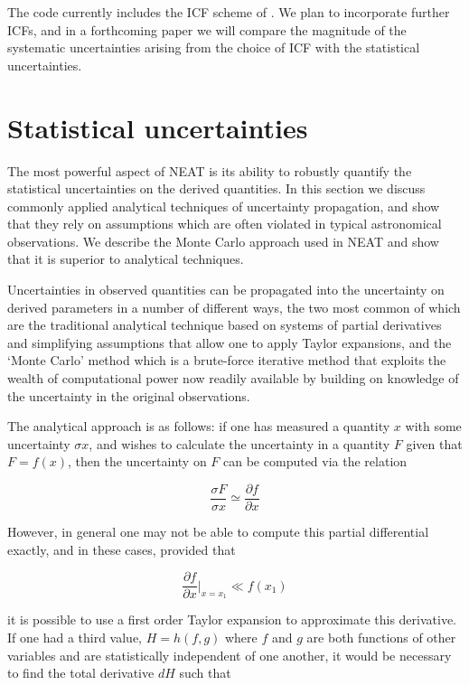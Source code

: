 \documentclass[useAMS,usenatbib]{mn2e}
\begin{document}
The code currently includes the ICF scheme of \citet{1994MNRAS.271..257K}.  We plan to incorporate further ICFs, and in a forthcoming paper we will compare the magnitude of the systematic uncertainties arising from the choice of ICF with the statistical uncertainties.

\section{Statistical uncertainties}

The most powerful aspect of NEAT is its ability to robustly quantify the statistical uncertainties on the derived quantities.  In this section we discuss commonly applied analytical techniques of uncertainty propagation, and show that they rely on assumptions which are often violated in typical astronomical observations.  We describe the Monte Carlo approach used in NEAT and show that it is superior to analytical techniques.

Uncertainties in observed quantities can be propagated into the uncertainty on derived parameters in a number of different ways, the two most common of which are the traditional analytical technique based on systems of partial derivatives and simplifying assumptions that allow one to apply Taylor expansions, and the `Monte Carlo' method which is a brute-force iterative method that exploits the wealth of computational power now readily available by building on knowledge of the uncertainty in the original observations.

The analytical approach is as follows: if one has measured a quantity $x$ with some uncertainty $\sigma x$, and wishes to calculate the uncertainty in a quantity $F$ given that $F = f(x)$, then the uncertainty on $F$ can be computed via the relation 

\begin{equation}
  \frac{\sigma F}{\sigma x} \simeq \frac{\partial f}{\partial x}
\end{equation}

However, in general one may not be able to compute this partial differential exactly, and in these cases, provided that

\begin{equation}
  \frac{\partial f}{\partial x}|_{x=x_1} \ll f(x_1)
\end{equation}

it is possible to use a first order Taylor expansion to approximate this derivative.  If one had a third value, $H = h(f, g)$ where $f$ and $g$ are both functions of other variables and are statistically independent of one another, it would be necessary to find the total derivative $dH$ such that
\end{document}
